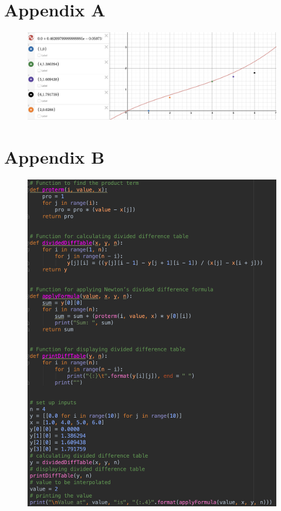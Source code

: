 \documentclass[12pt, letterpaper]{article}
\begin{document}
\pagebreak
\appendix
	\section{Appendix A}
            	\begin{figure}[h]
            		\centering
            		\includegraphics[width=1.0\linewidth]{plot.png}
            	\end{figure}
		
	\newpage
	\section{Appendix B}
            	\begin{figure}[h]
            		\centering
            		\includegraphics[width=.8\linewidth]{pythonCode.png}
            	\end{figure}
		
		
		
\end{document}
